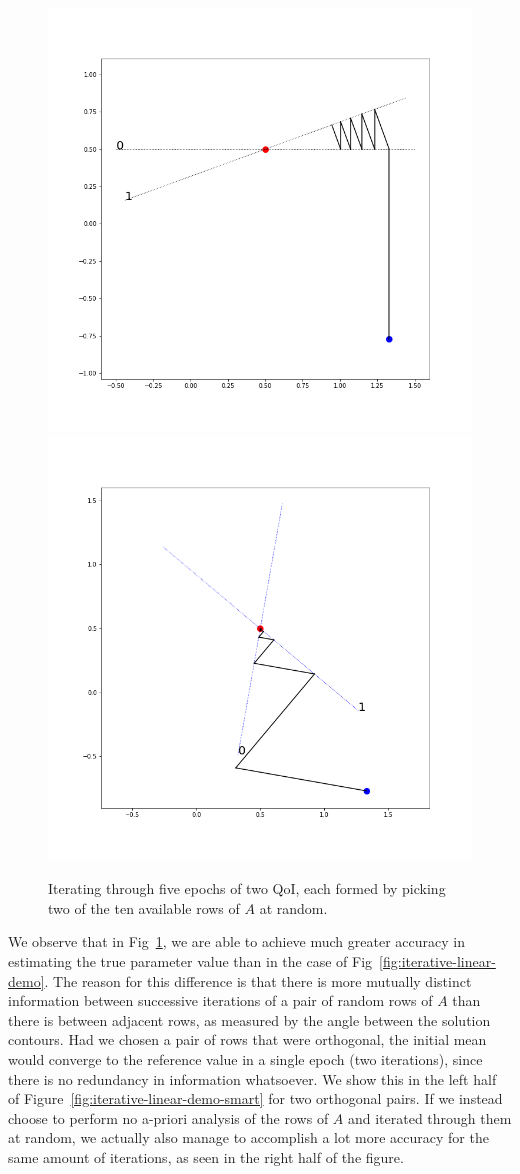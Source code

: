 \begin{figure}
  \centering
  \includegraphics[width=0.475\linewidth]{examples/iterative/10D-fewepochs-pair}
  \includegraphics[width=0.475\linewidth]{examples/iterative/10D-fewepochs-pair-alt}
  \caption{
  Iterating through five epochs of two QoI, each formed by picking two of the ten available rows of $A$ at random.
  }
  \label{fig:iterative-linear-demo-pair}
\end{figure}

We observe that in Fig~\ref{fig:iterative-linear-demo-pair}, we are able to achieve much greater accuracy in estimating the true parameter value than in the case of Fig~\ref{fig:iterative-linear-demo}.
The reason for this difference is that there is more mutually distinct information between successive iterations of a pair of random rows of $A$ than there is between adjacent rows, as measured by the angle between the solution contours.
Had we chosen a pair of rows that were orthogonal, the initial mean would converge to the reference value in a single epoch (two iterations), since there is no redundancy in information whatsoever.
We show this in the left half of Figure~\ref{fig:iterative-linear-demo-smart} for two orthogonal pairs.
If we instead choose to perform no a-priori analysis of the rows of $A$ and iterated through them at random, we actually also manage to accomplish a lot more accuracy for the same amount of iterations, as seen in the right half of the figure.

